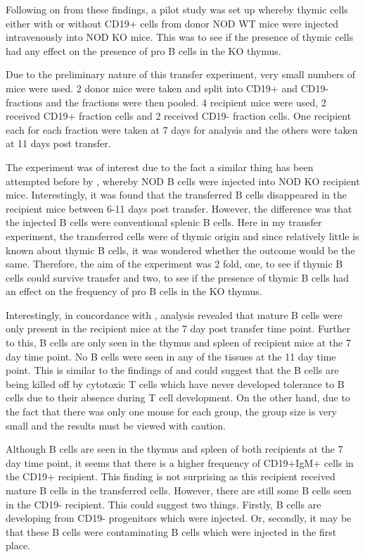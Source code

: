 Following on from these findings, a pilot study was set up whereby thymic cells either with or without CD19+ cells from donor NOD WT mice were injected intravenously into NOD KO mice.
This was to see if the presence of thymic cells had any effect on the presence of pro B cells in the KO thymus.

Due to the preliminary nature of this transfer experiment, very small numbers of mice were used.
2 donor mice were taken and split into CD19+ and CD19- fractions and the fractions were then pooled.
4 recipient mice were used, 2 received CD19+ fraction cells and 2 received CD19- fraction cells.
One recipient each for each fraction were taken at 7 days for analysis and the others were taken at 11 days post transfer.

The experiment was of interest due to the fact a similar thing has been attempted before by \citet{Serreze1998}, whereby NOD B cells were injected into NOD KO recipient mice.
Interestingly, it was found that the transferred B cells disappeared in the recipient mice between 6-11 days post transfer.
However, the difference was that the injected B cells were conventional splenic B cells.
Here in my transfer experiment, the transferred cells were of thymic origin and since relatively little is known about thymic B cells, it was wondered whether the outcome would be the same. 
Therefore, the aim of the experiment was 2 fold, one, to see if thymic B cells could survive transfer and two, to see if the presence of thymic B cells had an effect on the frequency of pro B cells in the KO thymus.

Interestingly, in concordance with \citet{Serreze1998}, analysis revealed that mature B cells were only present in the recipient mice at the 7 day post transfer time point.
Further to this, B cells are only seen in the thymus and spleen of recipient mice at the 7 day time point.
No B cells were seen in any of the tissues at the 11 day time point.
This is similar to the findings of \citet{Serreze1998} and could suggest that the B cells are being killed off by cytotoxic T cells which have never developed tolerance to B cells due to their absence during T cell development.
On the other hand, due to the fact that there was only one mouse for each group, the group size is very small and the results must be viewed with caution.

Although B cells are seen in the thymus and spleen of both recipients at the 7 day time point, it seems that there is a higher frequency of CD19+IgM+ cells in the CD19+ recipient.
This finding is not surprising as this recipient received mature B cells in the transferred cells.
However, there are still some B cells seen in the CD19- recipient.
This could suggest two things.
Firstly, B cells are developing from CD19- progenitors which were injected.
Or, secondly, it may be that these B cells were contaminating B cells which were injected in the first place.

